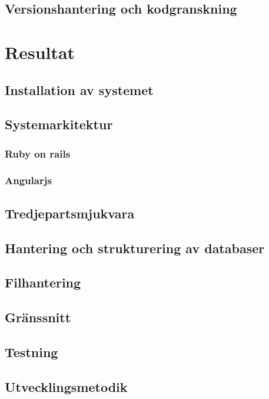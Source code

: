 \documentclass[a4paper,12pt,oneside,final]{extbook}
\begin{document}
\section{Versionshantering och kodgranskning}

\chapter{Resultat}

\section{Installation av systemet}

\section{Systemarkitektur}

\subsection{Ruby on rails}

\subsection{Angularjs}

\section{Tredjepartsmjukvara}

\section{Hantering och strukturering av databaser}

\section{Filhantering}

\section{Gränssnitt}

\section{Testning}

\section{Utvecklingsmetodik}
\end{document}
